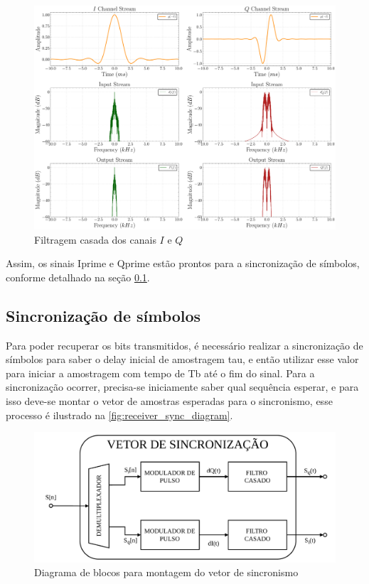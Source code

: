 \begin{figure}[H]
	\centering
	\caption{Filtragem casada dos canais $I$ e $Q$}\label{fig:receiver_matchedfilter}
	\includegraphics[width=\linewidth]{assets/cap3/receiver_mf_freq.pdf}
\end{figure}

Assim, os sinais \gls{Iprime} e \gls{Qprime} estão prontos para a sincronização de símbolos, conforme detalhado na seção \ref{sec:sincronizacao}.

\subsection{Sincronização de símbolos}\label{sec:sincronizacao}

Para poder recuperar os bits transmitidos, é necessário realizar a sincronização de símbolos para saber o delay inicial de amostragem \gls{tau}, e então utilizar esse valor para iniciar a amostragem com tempo de \gls{Tb} até o fim do sinal. Para a sincronização ocorrer, precisa-se iniciamente saber qual sequência esperar, e para isso deve-se montar o vetor de amostras esperadas para o sincronismo, esse processo é ilustrado na \autoref{fig:receiver_sync_diagram}.

\begin{figure}[H]
	\centering
	\caption{Diagrama de blocos para montagem do vetor de sincronismo}\label{fig:receiver_sync_diagram}
	\includegraphics[width=\linewidth]{assets/diagrams/sync.pdf}
\end{figure}


